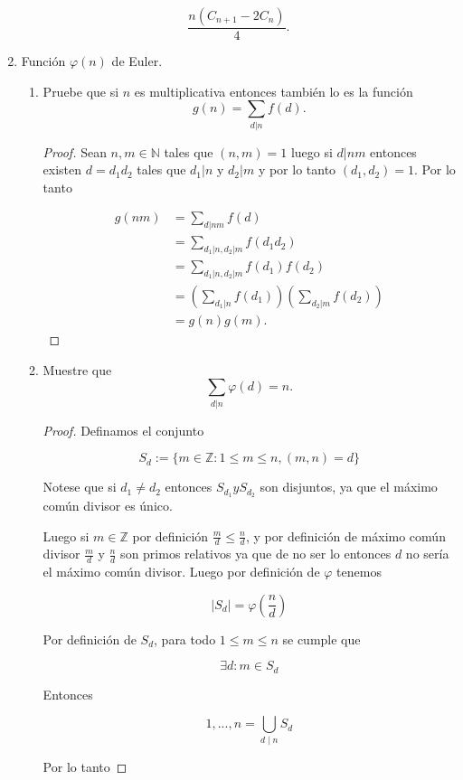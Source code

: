 \documentclass[letterpaper]{article}
\newcommand{\pars}[1]{\left( #1 \right) }
\newcommand{\N}{\mathbb{N}}
\newcommand{\Z}{\mathbb{Z}}
\newcommand{\1}{\mathbbm{1}}
\begin{document}
\begin{enumerate}
		\[\frac{n\pars{C_{n+1} - 2C_{n}}}{4}.\]

		\item Función $\varphi(n)$ de Euler.
		\begin{enumerate}
			\item Pruebe que si $n$ es multiplicativa entonces también lo es la función
			\[g(n) = \sum_{d|n} f(d).\]

			\begin{proof}
				Sean $n,m\in\N$ tales que $(n,m)=1$ luego si $d|nm$ entonces existen $d=d_1d_2$ tales que $d_1|n$ y $d_2|m$ y por lo tanto $(d_1,d_2) = 1$. Por lo tanto

				\begin{align*}
					g(nm) &= \sum_{d|nm} f(d)\\
					&= \sum_{d_1|n,d_2|m} f(d_1d_2)\\
					&= \sum_{d_1|n,d_2|m} f(d_1)f(d_2)\\
					&= \pars{\sum_{d_1|n} f(d_1)}\pars{\sum_{d_2|m} f(d_2)}\\
					&= g(n)g(m).
				\end{align*}
			\end{proof}

			\item Muestre que
			\[\sum_{d|n} \varphi(d) = n.\]

			\begin{proof}

				Definamos el conjunto 
				
				\[S_d := \{m \in \Z : 1 \leq m \leq n, (m,n) = d\}\]
				
				Notese que si $d_1 \neq d_2$ entonces $S_{d_1} y S_{d_2}$ son disjuntos, ya que el máximo común divisor es único.
				
				Luego si $m\in\Z$ por definición $\frac{m}{d}\leq\frac{n}{d}$, y por definición de máximo común divisor $\frac{m}{d}$ y $\frac{n}{d}$ son primos relativos ya que de no ser lo entonces $d$ no sería el máximo común divisor. Luego por definición de $\varphi$ tenemos
				
				\[|S_d| = \varphi\left(\frac{n}{d}\right)\]
				
				Por definición de $S_d$, para todo $1 \leq m \leq n$ se cumple que
				
				\[\exists d : m \in S_d\]
				
				Entonces
				
				\[{1,...,n} = \bigcup_{d\mid n} S_d\]
				
				Por lo tanto
				

\end{proof}
\end{enumerate}
\end{enumerate}
\end{document}
